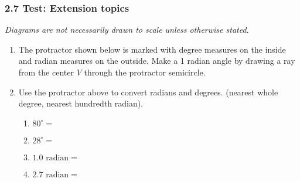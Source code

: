 

\fancyhead[LE]{\thepage}



\subsubsection*{2.7 Test: Extension topics}
\emph{Diagrams are not necessarily drawn to scale unless otherwise stated.}
\begin{enumerate}

\item The protractor shown below is marked with degree measures on the inside and radian measures on the outside. Make a 1 radian angle by drawing a ray from the center $V$ through the protractor semicircle. \par \medskip
  \begin{center}
  \end{center}

\item Use the protractor above to convert radians and degrees. (nearest whole degree, nearest hundredth radian).\vspace{.25cm}
  \begin{multicols}{2}
    \begin{enumerate}
      \item $80^\circ = $ \vspace{0.7cm}
      \item $28^\circ = $ \vspace{0.7cm}
      \item $\displaystyle 1.0 \text{ radian} =$ \vspace{0.7cm}
      \item $\displaystyle 2.7 \text{ radian} =$
    \end{enumerate}
  \end{multicols} \vspace{1cm}


\end{enumerate}
